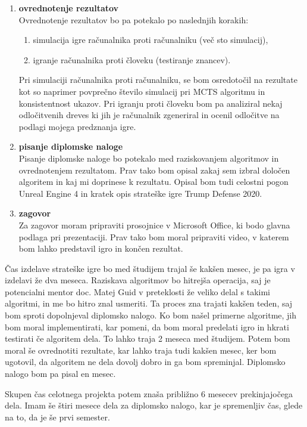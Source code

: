 \documentclass[11pt,a4paper]{article}
\begin{document}
\begin{enumerate}
	\item \textbf{ovrednotenje rezultatov}\\
	Ovrednotenje rezultatov bo pa potekalo po naslednjih korakih:
	\begin{enumerate}
		\item simulacija igre računalnika proti računalniku (več sto simulacij),
		\item igranje računalnika proti človeku (testiranje znancev).
	\end{enumerate}
	Pri simulaciji računalnika proti računalniku, se bom osredotočil na rezultate kot so naprimer povprečno število simulacij pri MCTS algoritmu in konsistentnost ukazov.
	Pri igranju proti človeku bom pa analiziral nekaj odločitvenih dreves ki jih je računalnik zgeneriral in ocenil odločitve na podlagi mojega predznanja igre.
	
	\item \textbf{pisanje diplomske naloge}\\
	Pisanje diplomske naloge bo potekalo med raziskovanjem algoritmov in ovrednotenjem rezultatom.
	Prav tako bom opisal zakaj sem izbral določen algoritem in kaj mi doprinese k rezultatu.
	Opisal bom tudi celostni pogon Unreal Engine 4 in kratek opis strateške igre Trump Defense 2020.
	\item \textbf{zagovor}\\
	Za zagovor moram pripraviti prosojnice v Microsoft Office, ki bodo glavna podlaga pri prezentaciji.
	Prav tako bom moral pripraviti video, v katerem bom lahko predstavil igro in končen rezultat.
	
	
\end{enumerate}
Čas izdelave strateške igre bo med študijem trajal še kakšen mesec, je pa igra v izdelavi že dva meseca. Raziskava algoritmov bo hitrejša operacija, saj je potencialni mentor doc. Matej Guid v preteklosti že veliko delal s takimi algoritmi, in me bo hitro znal usmeriti.
Ta proces zna trajati kakšen teden, saj bom sproti dopolnjeval diplomsko nalogo.
Ko bom našel primerne algoritme, jih bom moral implementirati, kar pomeni, da bom moral predelati igro in hkrati testirati če algoritem dela. To lahko traja 2 meseca med študijem.
Potem bom moral še ovrednotiti rezultate, kar lahko traja tudi kakšen mesec, ker bom ugotovil, da algoritem ne dela dovolj dobro in ga bom spreminjal.
Diplomsko nalogo bom pa pisal en mesec.

Skupen čas celotnega projekta potem znaša približno 6 mesecev prekinjajočega dela.
Imam še štiri mesece dela za diplomsko nalogo, kar je spremenljiv čas, glede na to, da je še prvi semester.
\end{document}
